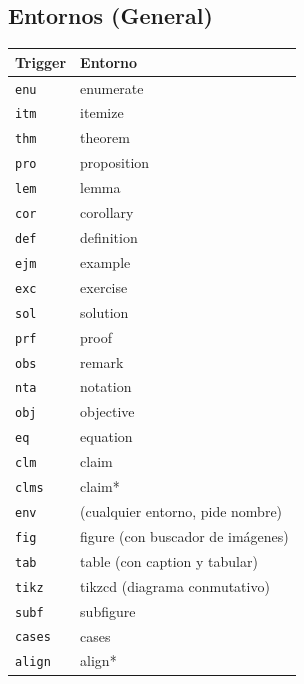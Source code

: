 \documentclass[11pt]{article}
\begin{document}
\subsection{Entornos (General)}
\label{sec:org6ead665}
\begin{center}
\begin{tabular}{ll}
Trigger & Entorno\\
\hline
\texttt{enu} & enumerate\\
\texttt{itm} & itemize\\
\texttt{thm} & theorem\\
\texttt{pro} & proposition\\
\texttt{lem} & lemma\\
\texttt{cor} & corollary\\
\texttt{def} & definition\\
\texttt{ejm} & example\\
\texttt{exc} & exercise\\
\texttt{sol} & solution\\
\texttt{prf} & proof\\
\texttt{obs} & remark\\
\texttt{nta} & notation\\
\texttt{obj} & objective\\
\texttt{eq} & equation\\
\texttt{clm} & claim\\
\texttt{clms} & claim*\\
\texttt{env} & (cualquier entorno, pide nombre)\\
\texttt{fig} & figure (con buscador de imágenes)\\
\texttt{tab} & table (con caption y tabular)\\
\texttt{tikz} & tikzcd (diagrama conmutativo)\\
\texttt{subf} & subfigure\\
\texttt{cases} & cases\\
\texttt{align} & align*\\
\end{tabular}
\end{center}
\end{document}
